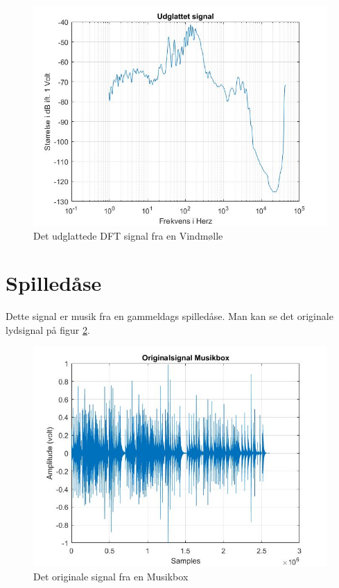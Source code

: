 \begin{figure}[H]
	\centering
	\includegraphics[width=140mm]{figures/Vind/udglattet.jpg}
	\caption{Det udglattede DFT signal fra en Vindmølle}
	\label{fig:Vind udglattet}
\end{figure}


\section{Spilledåse}
Dette signal er musik fra en gammeldags spilledåse. Man kan se det originale lydsignal på figur \ref{fig:Musikbox original}.
\begin{figure}[H]
	\centering
	\includegraphics[width=140mm]{figures/Musikbox/original.jpg}
	\caption{Det originale signal fra en Musikbox}
	\label{fig:Musikbox original}
\end{figure}

